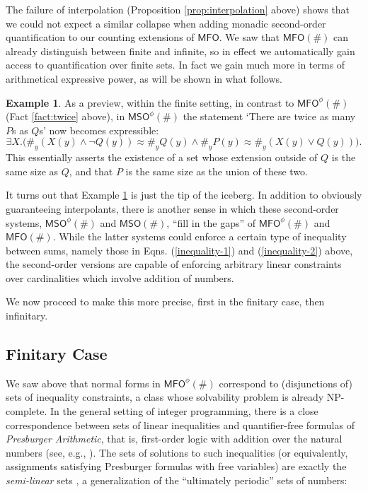 \documentclass[12pt,oneside,reqno]{amsart}
\theoremstyle{definition}
\newtheorem{example}{Example}
\begin{document}
The failure of interpolation (Proposition \ref{prop:interpolation} above) shows that we could not expect a similar collapse when adding monadic second-order quantification to our counting extensions of $\mathsf{MFO}$. We saw that $\mathsf{MFO}(\#)$ can already distinguish between finite and infinite, so in effect we automatically gain access to quantification over finite sets. In fact we gain much more in terms of arithmetical expressive power, as will be shown in what follows.

\begin{example} As a preview, within the finite setting, in contrast to $\mathsf{MFO}^\phi(\#)$ (Fact \ref{fact:twice} above), in $\mathsf{MSO}^\phi(\#)$ the statement `There are twice as many $P$s as $Q$s' now becomes expressible: \begin{equation*}
    \exists X . \big(\#_y (X(y) \wedge \neg Q(y)) \approx \#_y Q(y) \wedge \#_y P(y) \approx \#_y (X(y)\vee Q(y)) \big).
\end{equation*} This essentially asserts the existence of a set whose extension outside of $Q$ is the same size as $Q$, and that $P$ is the same size as the union of these two. \label{example:twice} \end{example}

It turns out that Example \ref{example:twice} is just the tip of the iceberg. In addition to obviously  guaranteeing interpolants, there is another sense in which these second-order systems, $\mathsf{MSO}^\phi(\#)$ and $\mathsf{MSO}(\#)$, ``fill in the gaps'' of $\mathsf{MFO}^\phi(\#)$ and  $\mathsf{MFO}(\#)$. While the latter systems could enforce a certain type of inequality between sums, namely those in Eqns.  (\ref{inequality-1}) and (\ref{inequality-2}) above, the second-order versions are capable of enforcing arbitrary linear constraints over cardinalities which involve addition of numbers. 

 

We now proceed to make this more precise, first in the finitary case, then infinitary. \vspace{-1ex}

\subsection{Finitary Case} \label{section:finiteSO} We saw above that normal forms in $\mathsf{MFO}^\phi(\#)$ correspond to (disjunctions of) sets of inequality constraints, a class whose solvability problem is already NP-complete. In the general setting of integer programming, there is a close correspondence between sets of linear inequalities and quantifier-free formulas of \emph{Presburger Arithmetic}, that is, first-order logic with addition over the natural numbers (see, e.g., \citealt{OPPEN1978323}). The sets of solutions to such inequalities (or equivalently, assignments satisfying Presburger formulas with free variables) are exactly the \emph{semi-linear} sets \citep{Ginsburg}, a generalization of the ``ultimately periodic'' sets of numbers:
\end{document}
